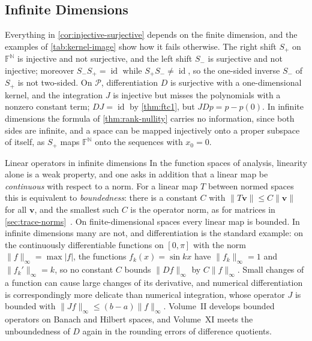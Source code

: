 \subsection{Infinite Dimensions}

Everything in \cref{cor:injective-surjective} depends on the finite dimension, and the examples of \cref{tab:kernel-image} show how it fails otherwise. The right shift $S_+$ on $\mathbb F^{\mathbb N}$ is injective and not surjective, and the left shift $S_-$ is surjective and not injective; moreover $S_-S_+=\operatorname{id}$ while $S_+S_-\ne\operatorname{id}$, so the one-sided inverse $S_-$ of $S_+$ is not two-sided. On $\mathcal P$, differentiation $D$ is surjective with a one-dimensional kernel, and the integration $J$ is injective but misses the polynomials with a nonzero constant term; $DJ=\operatorname{id}$ by \cref{thm:ftc1}, but $JDp=p-p(0)$. In infinite dimensions the formula of \cref{thm:rank-nullity} carries no information, since both sides are infinite, and a space can be mapped injectively onto a proper subspace of itself, as $S_+$ maps $\mathbb F^{\mathbb N}$ onto the sequences with $x_0=0$.

\begin{note}{Linear operators in infinite dimensions}
In the function spaces of analysis, linearity alone is a weak property, and one asks in addition that a linear map be \emph{continuous} with respect to a norm. For a linear map $T$ between normed spaces this is equivalent to \emph{boundedness}: there is a constant $C$ with $\|T\mathbf v\|\le C\|\mathbf v\|$ for all $\mathbf v$, and the smallest such $C$ is the operator norm, as for matrices in \cref{sec:trace-norms}~\cite[Sect.~5.1]{folland1999}. On finite-dimensional spaces every linear map is bounded. In infinite dimensions many are not, and differentiation is the standard example: on the continuously differentiable functions on $[0,\pi]$ with the norm $\|f\|_\infty=\max|f|$, the functions $f_k(x)=\sin kx$ have $\|f_k\|_\infty=1$ and $\|f_k'\|_\infty=k$, so no constant $C$ bounds $\|Df\|_\infty$ by $C\|f\|_\infty$. Small changes of a function can cause large changes of its derivative, and numerical differentiation is correspondingly more delicate than numerical integration, whose operator $J$ is bounded with $\|Jf\|_\infty\le(b-a)\|f\|_\infty$. Volume~II develops bounded operators on Banach and Hilbert spaces, and Volume~XI meets the unboundedness of $D$ again in the rounding errors of difference quotients.
\end{note}

